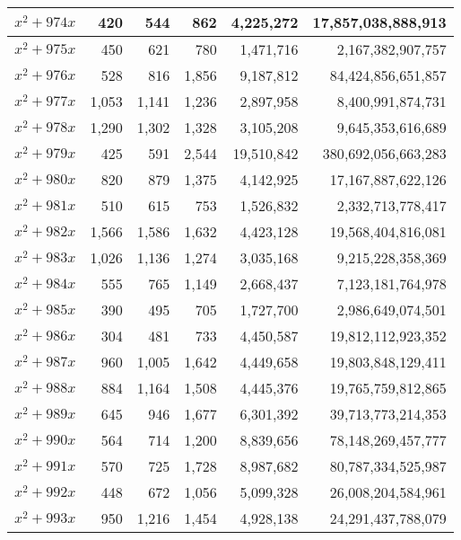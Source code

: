 \documentclass[a4paper]{amsproc}
\theoremstyle{plain}
\theoremstyle{named}
\begin{document}
\begin{longtable}{ | l | r | r | r | r | r | }
$x^2 + 974x$ & 420 & 544 & 862 & 4{,}225{,}272 & 17{,}857{,}038{,}888{,}913 \\ \hline
$x^2 + 975x$ & 450 & 621 & 780 & 1{,}471{,}716 & 2{,}167{,}382{,}907{,}757 \\ \hline
$x^2 + 976x$ & 528 & 816 & 1{,}856 & 9{,}187{,}812 & 84{,}424{,}856{,}651{,}857 \\ \hline
$x^2 + 977x$ & 1{,}053 & 1{,}141 & 1{,}236 & 2{,}897{,}958 & 8{,}400{,}991{,}874{,}731 \\ \hline
$x^2 + 978x$ & 1{,}290 & 1{,}302 & 1{,}328 & 3{,}105{,}208 & 9{,}645{,}353{,}616{,}689 \\ \hline
$x^2 + 979x$ & 425 & 591 & 2{,}544 & 19{,}510{,}842 & 380{,}692{,}056{,}663{,}283 \\ \hline
$x^2 + 980x$ & 820 & 879 & 1{,}375 & 4{,}142{,}925 & 17{,}167{,}887{,}622{,}126 \\ \hline
$x^2 + 981x$ & 510 & 615 & 753 & 1{,}526{,}832 & 2{,}332{,}713{,}778{,}417 \\ \hline
$x^2 + 982x$ & 1{,}566 & 1{,}586 & 1{,}632 & 4{,}423{,}128 & 19{,}568{,}404{,}816{,}081 \\ \hline
$x^2 + 983x$ & 1{,}026 & 1{,}136 & 1{,}274 & 3{,}035{,}168 & 9{,}215{,}228{,}358{,}369 \\ \hline
$x^2 + 984x$ & 555 & 765 & 1{,}149 & 2{,}668{,}437 & 7{,}123{,}181{,}764{,}978 \\ \hline
$x^2 + 985x$ & 390 & 495 & 705 & 1{,}727{,}700 & 2{,}986{,}649{,}074{,}501 \\ \hline
$x^2 + 986x$ & 304 & 481 & 733 & 4{,}450{,}587 & 19{,}812{,}112{,}923{,}352 \\ \hline
$x^2 + 987x$ & 960 & 1{,}005 & 1{,}642 & 4{,}449{,}658 & 19{,}803{,}848{,}129{,}411 \\ \hline
$x^2 + 988x$ & 884 & 1{,}164 & 1{,}508 & 4{,}445{,}376 & 19{,}765{,}759{,}812{,}865 \\ \hline
$x^2 + 989x$ & 645 & 946 & 1{,}677 & 6{,}301{,}392 & 39{,}713{,}773{,}214{,}353 \\ \hline
$x^2 + 990x$ & 564 & 714 & 1{,}200 & 8{,}839{,}656 & 78{,}148{,}269{,}457{,}777 \\ \hline
$x^2 + 991x$ & 570 & 725 & 1{,}728 & 8{,}987{,}682 & 80{,}787{,}334{,}525{,}987 \\ \hline
$x^2 + 992x$ & 448 & 672 & 1{,}056 & 5{,}099{,}328 & 26{,}008{,}204{,}584{,}961 \\ \hline
$x^2 + 993x$ & 950 & 1{,}216 & 1{,}454 & 4{,}928{,}138 & 24{,}291{,}437{,}788{,}079 \\ \hline

\end{longtable}
\end{document}
